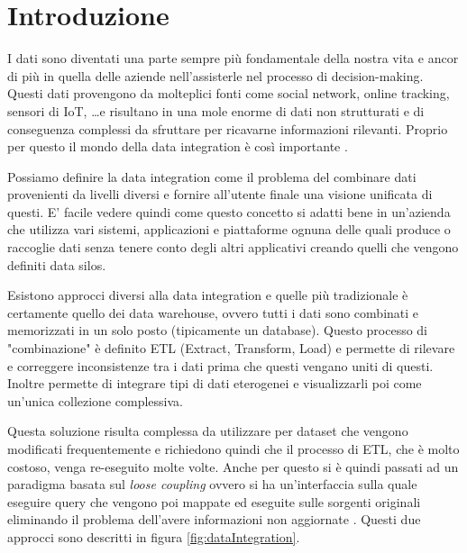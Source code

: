 \chapter{Introduzione}
\label{cha:intro}

I dati sono diventati una parte sempre più fondamentale della nostra vita e ancor di più in quella delle aziende nell'assisterle nel processo di decision-making.
Questi dati provengono da molteplici fonti come social network, online tracking, sensori di IoT, \dots e risultano in una mole enorme di dati non strutturati e
di conseguenza complessi da sfruttare per ricavarne informazioni rilevanti.
Proprio per questo il mondo della data integration è così importante \cite{DataIntegration}.

Possiamo definire la data integration come il problema del combinare dati provenienti da livelli diversi e fornire all'utente finale una 
visione unificata di questi\cite{dataIntegrationDef}. E' facile vedere quindi come questo concetto si adatti bene in un'azienda che utilizza vari sistemi, applicazioni 
e piattaforme ognuna delle quali produce o raccoglie dati senza tenere conto degli altri applicativi creando quelli che vengono definiti data silos.

Esistono approcci diversi alla data integration e quelle più tradizionale è certamente quello dei data warehouse, ovvero tutti i dati sono combinati e memorizzati in un solo posto (tipicamente un database). 
Questo processo di "combinazione" è definito ETL (Extract, Transform, Load) e permette di rilevare e correggere inconsistenze tra i dati prima che questi vengano uniti di questi. Inoltre permette di integrare 
tipi di dati eterogenei e visualizzarli poi come un'unica collezione complessiva.

Questa soluzione risulta complessa da utilizzare per dataset che vengono modificati frequentemente e richiedono quindi che il processo di ETL, che è molto costoso, venga re-eseguito molte volte.
Anche per questo si è quindi passati ad un paradigma basata sul \textit{loose coupling} ovvero si ha un'interfaccia sulla quale eseguire query che vengono poi mappate ed eseguite sulle sorgenti originali eliminando il 
problema dell'avere informazioni non aggiornate \cite{DataIntegrationHistory}. Questi due approcci sono descritti in figura \ref{fig:dataIntegration}.

